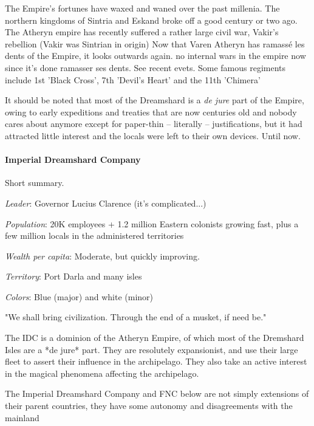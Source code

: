 The Empire's fortunes have waxed and waned over the past millenia. The northern kingdoms of Sintria and Eskand broke off a good century or two ago. The Atheryn empire has recently suffered a rather large civil war, Vakir's rebellion (Vakir was Sintrian in origin) Now that Varen Atheryn has ramassé les dents of the Empire, it looks outwards again.  no internal wars in the empire now since it's done ramasser ses dents. See recent evets. Some famous regiments include 1st 'Black Cross', 7th 'Devil's Heart' and the 11th 'Chimera'

It should be noted that most of the Dreamshard is a \textit{de jure} part of the Empire, owing to early expeditions and treaties that are now centuries old and nobody cares about anymore except for paper-thin -- literally -- justifications, but it had attracted little interest and the locals were left to their own devices. Until now.



\paragraph{Imperial Dreamshard Company}

Short summary.

\textit{Leader}: Governor Lucius Clarence (it's complicated...)

\textit{Population}: 20K employees + 1.2 million Eastern colonists growing fast, plus a few million locals in the administered territories

\textit{Wealth per capita}: Moderate, but quickly improving.

\textit{Territory}: Port Darla and many isles

\textit{Colors}: Blue (major) and white (minor)


\begin{rpg-quotebox}
    "We shall bring civilization. Through the end of a musket, if need be."
    \end{rpg-quotebox}
    



The IDC is a dominion of the Atheryn Empire, of which most of the Dremshard Isles are a *de jure* part. They are resolutely expansionist, and use their large fleet to assert their influence in the archipelago. They also take an active interest in the magical phenomena affecting the archipelago.


The Imperial Dreamshard Company and FNC below are not simply extensions of their parent countries, they have some autonomy and disagreements with the mainland



